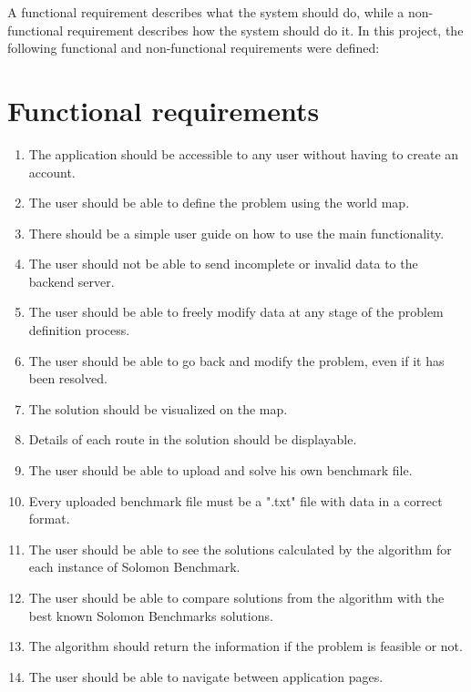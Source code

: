 \documentclass[a4paper,twoside,12pt]{book}
\begin{document}
A functional requirement describes what the system should do, while a non-functional requirement describes how the system should do it. In this project, the following functional and non-functional requirements were defined:

\section{Functional requirements}
\begin{enumerate}
    \item The application should be accessible to any user without having to create an account.
    \item The user should be able to define the problem using the world map.
    \item There should be a simple user guide on how to use the main functionality.
    \item The user should not be able to send incomplete or invalid data to the backend server.
    \item The user should be able to freely modify data at any stage of the problem definition process.
    \item The user should be able to go back and modify the problem, even if it has been resolved.
    \item The solution should be visualized on the map.
    \item Details of each route in the solution should be displayable.
    \item The user should be able to upload and solve his own benchmark file.
    \item Every uploaded benchmark file must be a ".txt" file with data in a correct format.
    \item The user should be able to see the solutions calculated by the algorithm for each instance of Solomon Benchmark.
    \item The user should be able to compare solutions from the algorithm with the best known Solomon Benchmarks solutions.
    \item The algorithm should return the information if the problem is feasible or not.
    \item The user should be able to navigate between application pages.
\end{enumerate}
\end{document}
